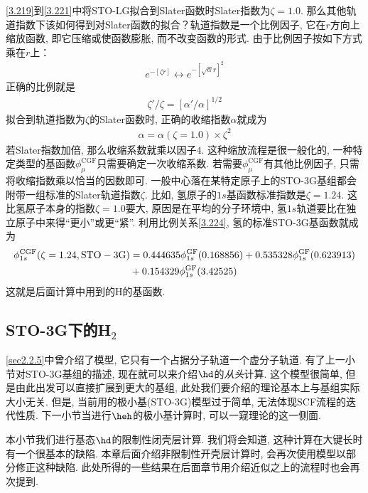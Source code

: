 \autoref{3.219}到\autoref{3.221}中将STO-LG拟合到Slater函数时Slater指数为$\zeta=1.0$. 
那么其他轨道指数下该如何得到对Slater函数的拟合？轨道指数是一个比例因子, 
它在$r$方向上缩放函数, 
即它压缩或使函数膨胀, 
而不改变函数的形式. 
由于比例因子按如下方式乘在$r$上：
\begin{align}
	e^{-[\zeta r]} \leftrightarrow e^{-[\sqrt{\alpha}r]^2}
\end{align}
正确的比例就是
\begin{align}
	\zeta'/\zeta=[\alpha'/\alpha]^{1/2}
\end{align}
拟合到轨道指数为$\zeta$的Slater函数时, 
正确的收缩指数$\alpha$就成为
\begin{align}
	\label{3.224}
	\alpha = \alpha(\zeta=1.0)\times \zeta^2
\end{align}
若Slater指数加倍, 
那么收缩系数就乘以因子$4$. 
这种缩放流程是很一般化的, 
一种特定类型的基函数$\phi_\mu^\mathrm{CGF}$只需要确定一次收缩系数. 
若需要$\phi_\mu^\mathrm{CGF}$有其他比例因子, 
只需将收缩指数乘以恰当的因数即可. 
一般中心落在某特定原子上的STO-3G基组都会附带一组标准的Slater轨道指数$\zeta$. 
比如, 
氢原子的$1s$基函数标准指数是$\zeta=1.24$. 
这比氢原子本身的指数$\zeta=1.0$要大, 
原因是在平均的分子环境中, 
氢$1s$轨道要比在独立原子中来得``更小”或更``紧”. 
利用比例关系\autoref{3.224}, 
氢的标准STO-3G基函数就成为
\begin{align}
	\label{3.225}
	\phi_{1s}^\mathrm{CGF}(\zeta=1.24,\mathrm{STO-3G}) & = 0.444635\phi_{1s}^\mathrm{GF}(0.168856) + 0.535328\phi_{1s}^\mathrm{GF}(0.623913) \notag\\
	& + 0.154329\phi_{1s}^\mathrm{GF}(3.42525)
\end{align}
这就是后面计算中用到的$\mathrm{H}$的基函数.
\subsection{STO-3G下的H$_2$}
\label{sec:3.5.2}
\autoref{sec2.2.5}中曾介绍了模型, 它只有一个占据分子轨道一个虚分子轨道. 
有了上一小节对STO-3G基组的描述, 现在就可以来介绍$\hd$的\emph{从头}\hft 计算. 
这个模型很简单, 但是由此出发可以直接扩展到更大的基组, 此处我们要介绍的\hft 理论基本上与基组实际大小无关. 
但是, 当前用的极小基(STO-3G)模型过于简单, 无法体现SCF流程的迭代性质. 
下一小节当进行$\heh$的极小基计算时, 可以一窥\hft 理论的这一侧面.

本小节我们进行基态$\hd$的限制性闭壳层计算. 
我们将会知道, 
这种计算在大键长时有一个很基本的缺陷. 
本章后面介绍非限制性开壳层计算时, 
会再次使用模型以部分修正这种缺陷. 
此处所得的一些结果在后面章节用介绍\hft 近似之上的流程时也会再次提到.


